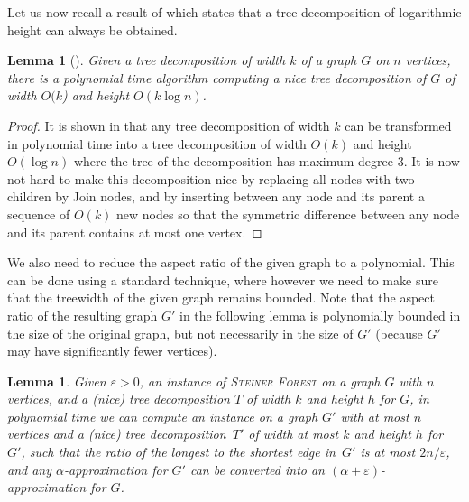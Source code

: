 \documentclass[a4paper]{article}
\let\oldcitet\citet
\renewcommand{\citet}[1]{\mbox{\oldcitet{#1}}}
\theoremstyle{plain}
\newtheorem{lemma}[theorem]{Lemma}%
\newcommand{\eps}{{\varepsilon}}
\newcommand{\pname}[1]{\textsc{#1}}
\newcommand{\SF}{\pname{Steiner Forest}\xspace}
\begin{document}
Let us now recall a result of \citet{BodlaenderH98} which states that a tree
decomposition of logarithmic height can always be obtained.

\begin{lemma}[\cite{BodlaenderH98}]\label{lem:nice-tree-decomp}
%
%
Given a tree decomposition of width $k$ of a graph $G$ on $n$ vertices, there is a
polynomial time algorithm computing a nice tree decomposition of $G$ of
width $O(k$) and height $O(k\log n)$.  \end{lemma}

%
\begin{proof}%
It is shown in \cite{BodlaenderH98} that any tree decomposition
of width $k$ can be transformed in polynomial time into a tree decomposition of
width $O(k)$ and height $O(\log n)$ where the tree of the decomposition has
maximum degree $3$. It is now not hard to make this decomposition nice by
replacing all nodes with two children by Join nodes, and by inserting between
any node and its parent a sequence of $O(k)$ new nodes so that the symmetric
difference between any node and its parent contains at most one vertex.
\end{proof} 
%

We also need to reduce the aspect ratio of the given graph to a polynomial.
This can be done using a standard technique, where however we need to make
sure that the treewidth of the given graph remains bounded.  
Note that the aspect ratio of the resulting graph $G'$ in the following lemma
is polynomially bounded in the size of the original graph, 
but not necessarily in the size of $G'$  (because $G'$ may have
significantly fewer vertices).
%
%
%
%
%
%

\begin{lemma}\label{lem:aspect-ratio} %
Given $\eps>0$, an instance of \SF on a
graph $G$ with $n$ vertices, and a (nice) tree decomposition $T$ of width $k$
and height $h$ for $G$, in polynomial time we can compute an instance on a
graph $G'$ with at most $n$ vertices and a (nice) tree decomposition~$T'$ of
width at most $k$ and height $h$ for~$G'$, such that the ratio of the longest
to the shortest edge in~$G'$ is at most $2n/\eps$, and any
$\alpha$-approximation for $G'$ can be converted into an
$(\alpha+\eps)$-approximation for $G$.  
\end{lemma} 
\end{document}
